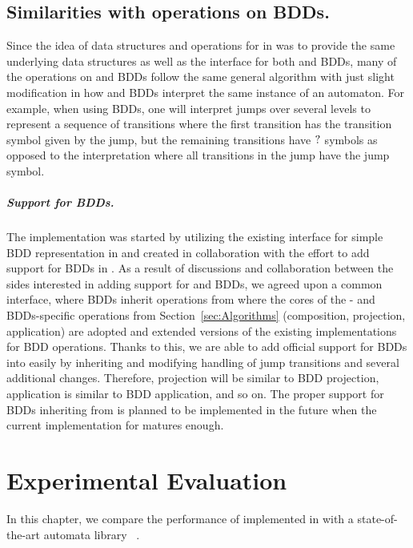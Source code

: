 \section{Similarities with operations on BDDs.}
Since the idea of data structures and operations for \nfts in \mata was to provide the same underlying data structures as well as the interface for both \nfts and BDDs, many of the operations on \nfts and BDDs follow the same general algorithm with just slight modification in how \nfts and BDDs interpret the same instance of an \nft automaton.
For example, when using BDDs, one will interpret jumps over several levels to represent a sequence of transitions where the first transition has the transition symbol given by the jump, but the remaining transitions have $?$ symbols as opposed to the \nft interpretation where all transitions in the jump have the jump symbol.

\paragraph{Support for BDDs.}
The implementation was started by utilizing the existing interface for simple BDD representation in \mata and created in collaboration with the effort to add support for BDDs in \mata.
As a result of discussions and collaboration between the sides interested in adding support for \nfts and BDDs, we agreed upon a common interface, where BDDs inherit operations from \nfts where the cores of the \nfts- and BDDs-specific operations from Section~\ref{sec:Algorithms} (composition, projection, application) are adopted and extended versions of the existing implementations for BDD operations.
Thanks to this, we are able to add official support for BDDs into \mata easily by inheriting \nft and modifying handling of jump transitions and several additional changes.
Therefore, \nft projection will be similar to BDD projection, \nft application is similar to BDD application, and so on.
The proper support for BDDs inheriting from \nfts is planned to be implemented in the future when the current implementation for \nfts matures enough.

\chapter{Experimental Evaluation}

In this chapter, we compare the performance of \nfts implemented in \mata with a state-of-the-art automata library \mona~\cite{mona}.

